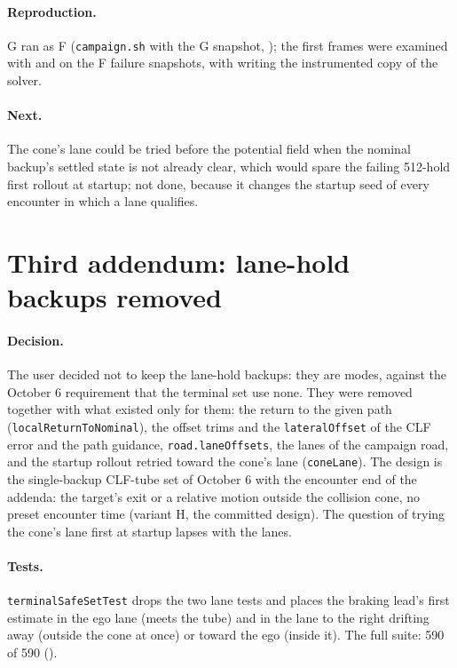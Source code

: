 \documentclass[11pt]{article}
\begin{document}
\paragraph{Reproduction.} G ran as F (\texttt{campaign.sh} with the G
snapshot, ); the first frames were examined with
 and  on the F
failure snapshots, with  writing the
instrumented copy of the solver.

\paragraph{Next.} The cone's lane could be tried before the potential field
when the nominal backup's settled state is not already clear, which would
spare the failing 512-hold first rollout at startup; not done, because it
changes the startup seed of every encounter in which a lane qualifies.

\section{Third addendum: lane-hold backups removed}
\paragraph{Decision.} The user decided not to keep the lane-hold backups: they
are modes, against the October 6 requirement that the terminal set use none.
They were removed together with what existed only for them: the return to the
given path (\texttt{localReturnToNominal}), the offset trims and the
\texttt{lateralOffset} of the CLF error and the path guidance,
\texttt{road.laneOffsets}, the lanes of the campaign road, and the startup
rollout retried toward the cone's lane (\texttt{coneLane}). The design is the
single-backup CLF-tube set of October 6 with the encounter end of the
addenda: the target's exit or a relative motion outside the collision cone,
no preset encounter time (variant H, the committed design). The question of
trying the cone's lane first at startup lapses with the lanes.

\paragraph{Tests.} \texttt{terminalSafeSetTest} drops the two lane tests and
places the braking lead's first estimate in the ego lane (meets the tube) and
in the lane to the right drifting away (outside the cone at once) or toward
the ego (inside it). The full suite: 590 of 590 ().
\end{document}
